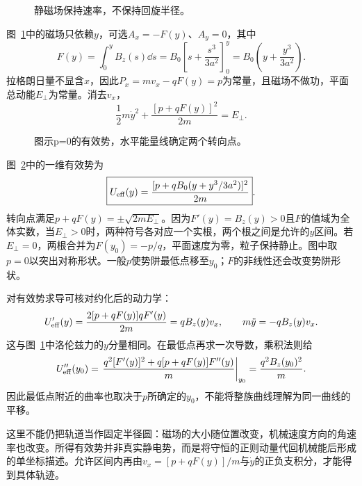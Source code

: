 \begin{figure}[H]\centering
{}
\caption{静磁场保持速率，不保持回旋半径。}\label{fig:i1-h6-q}
\end{figure}
\begin{solution}
图~\ref{fig:i1-h6-q}中的磁场只依赖$y$，可选$A_x=-F(y)$、$A_y=0$，其中
\[F(y)=\int_0^yB_z(s)\dd s
=B_0\left[s+\frac{s^3}{3a^2}\right]_0^y
=B_0\left(y+\frac{y^3}{3a^2}\right).
\]
拉格朗日量不显含$x$，因此$P_x=mv_x-qF(y)=p$为常量，且磁场不做功，平面总动能$E_\perp$为常量。消去$v_x$，
\[\frac12m\dot y^2+\frac{[p+qF(y)]^2}{2m}=E_\perp.
\]

\begin{figure}[H]\centering
{}
\caption{图示p=0的有效势，水平能量线确定两个转向点。}\label{fig:i1-h6-s}
\end{figure}

图~\ref{fig:i1-h6-s}中的一维有效势为
\[\boxed{U_{\rm eff}(y)=\frac{[p+qB_0(y+y^3/3a^2)]^2}{2m}}.
\]
转向点满足$p+qF(y)=\pm\sqrt{2mE_\perp}$。因为$F'(y)=B_z(y)>0$且$F$的值域为全体实数，当$E_\perp>0$时，两种符号各对应一个实根，两个根之间是允许的$y$区间。若$E_\perp=0$，两根合并为$F(y_0)=-p/q$，平面速度为零，粒子保持静止。图中取$p=0$以突出对称形状。一般$p$使势阱最低点移至$y_0$；$F$的非线性还会改变势阱形状。

对有效势求导可核对约化后的动力学：
\[U_{\rm eff}'(y)=\frac{2[p+qF(y)]qF'(y)}{2m}
=qB_z(y)v_x,\qquad m\ddot y=-qB_z(y)v_x.\]
这与图~\ref{fig:i1-h6-q}中洛伦兹力的$y$分量相同。在最低点再求一次导数，乘积法则给
\[U_{\rm eff}''(y_0)
=\left.\frac{q^2[F'(y)]^2+q[p+qF(y)]F''(y)}m\right|_{y_0}
=\frac{q^2B_z(y_0)^2}{m}.\]
因此最低点附近的曲率也取决于$p$所确定的$y_0$，不能将整族曲线理解为同一曲线的平移。

这里不能仍把轨道当作固定半径圆：磁场的大小随位置改变，机械速度方向的角速率也改变。所得有效势并非真实静电势，而是将守恒的正则动量代回机械能后形成的单坐标描述。允许区间内再由$v_x=[p+qF(y)]/m$与$\dot y$的正负支积分，才能得到具体轨迹。
\end{solution}

